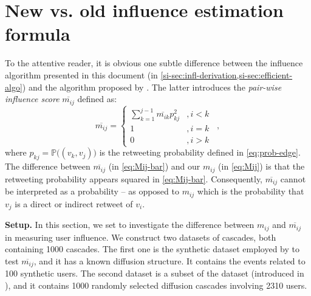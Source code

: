 
\section{New vs. old influence estimation formula}
\label{si-sec:new-vs-old-formula}


To the attentive reader, it is obvious one subtle difference between the influence algorithm presented in this document (in \cref{si-sec:infl-derivation,si-sec:efficient-algo}) and the algorithm proposed by \citet{Rizoiu2018a}.
The latter introduces the \emph{pair-wise influence score} $\overline{m_{ij}}$ defined as:
\begin{equation} \label{eq:Mij-bar}
\overline{m_{ij}}=
\left\{
\begin{array}{ll}
	\sum^{j-1}_{k=1} \overline{m_{ik}}p^2_{kj} &,i < k \\
	1 & ,i = k \\
	0 & ,i > k
\end{array}
\right. \enspace ,
\end{equation} 
where $p_{kj} = \mathds{P}\big((v_k, v_j)\big)$ is the retweeting probability defined in \cref{eq:prob-edge}.
The difference between $\overline{m_{ij}}$ (in \cref{eq:Mij-bar}) and our $m_{ij}$ (in \cref{eq:Mij}) is that the retweeting probability appears squared in \cref{eq:Mij-bar}.
Consequently, $\overline{m_{ij}}$ cannot be interpreted as a probability -- as opposed to $m_{ij}$ which is the probability that $v_j$ is a direct or indirect retweet of $v_i$.

\textbf{Setup.}
In this section, we set to investigate the difference between $m_{ij}$ and $\overline{m_{ij}}$ in measuring user influence.
We construct two datasets of cascades, both containing 1000 cascades.
The first one is the synthetic dataset employed by \citet{Rizoiu2018a} to test $\overline{m_{ij}}$, and it has a known diffusion structure.
It contains the events related to 100 synthetic users.
The second dataset is a subset of the \debate dataset (introduced in \citep{Rizoiu2018a}), and it contains 1000 randomly selected diffusion cascades involving 2310 users.

